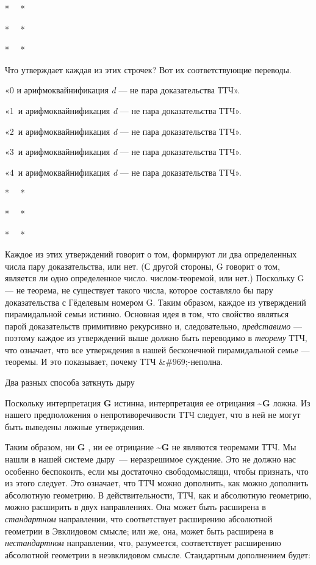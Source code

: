 \documentclass[../main.tex]{subfiles}
\begin{document}
*~~ *

*~~ *

*~~ *

Что утверждает каждая из этих строчек? Вот их соответствующие переводы.

«0 и арифмоквайнификация \emph{d} --- не пара доказательства ТТЧ».

«1~и арифмоквайнификация \emph{d} --- не пара доказательства ТТЧ».

«2~и арифмоквайнификация \emph{d} --- не пара доказательства ТТЧ».

«3~и арифмоквайнификация \emph{d} --- не пара доказательства ТТЧ».

«4~и арифмоквайнификация \emph{d} --- не пара доказательства ТТЧ».

*~~ *

*~~ *

*~~ *

Каждое из этих утверждений говорит о том, формируют ли два определенных числа пару доказательства, или нет. (С другой стороны, G говорит о том, является ли одно определенное число. числом-теоремой, или нет.) Поскольку G --- не теорема, не существует такого числа, которое составляло бы пару доказательства с Гёделевым номером G. Таким образом, каждое из утверждений пирамидальной семьи истинно. Основная идея в том, что свойство являться парой доказательств примитивно рекурсивно и, следовательно, \emph{представимо} --- поэтому каждое из утверждений выше должно быть переводимо в \emph{теорему} ТТЧ, что означает, что все утверждения в нашей бесконечной пирамидальной семье --- теоремы. И это показывает, почему ТТЧ \&\#969;-неполна.

Два разных способа заткнуть дыру

Поскольку интерпретация \textbf{G} истинна, интерпретация ее отрицания \textbf{\textasciitilde G} ложна. Из нашего предположения о непротиворечивости ТТЧ следует, что в ней не могут быть выведены ложные утверждения.

Таким образом, ни \textbf{G} , ни ее отрицание \textbf{\textasciitilde G} не являются теоремами ТТЧ. Мы нашли в нашей системе дыру~--- неразрешимое суждение. Это не должно нас особенно беспокоить, если мы достаточно свободомыслящи, чтобы признать, что из этого следует. Это означает, что ТТЧ можно дополнить, как можно дополнить абсолютную геометрию. В действительности, ТТЧ, как и абсолютную геометрию, можно расширить в двух направлениях. Она может быть расширена в \emph{стандартном} направлении, что соответствует расширению абсолютной геометрии в Эвклидовом смысле; или же, она, может быть расширена в \emph{нестандартном} направлении, что, разумеется, соответствует расширению абсолютной геометрии в неэвклидовом смысле. Стандартным дополнением будет:
\end{document}
